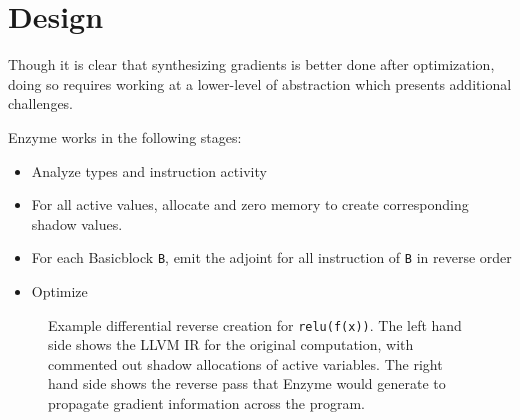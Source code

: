 \section{Design}
\label{sec:design}
Though it is clear that synthesizing gradients is better done after optimization, doing so requires working at a lower-level of abstraction which presents additional challenges.

Enzyme works in the following stages:
\begin{itemize}
    \item Analyze types and instruction activity
    \item For all active values, allocate and zero memory to create corresponding shadow values.
    \item For each Basicblock \texttt{B}, emit the adjoint for all instruction of \texttt{B} in reverse order
    \item Optimize
\end{itemize}






\begin{figure}
    \centering
{}
    \caption{Example differential reverse creation for \texttt{relu(f(x))}. The left hand side shows the LLVM IR for the original computation, with commented out shadow allocations of active variables. The right hand side shows the reverse pass that Enzyme would generate to propagate gradient information across the program.}
    \label{fig:reluf}
\end{figure}

